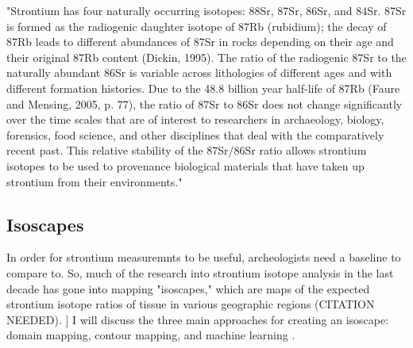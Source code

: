 \documentclass[a4paper, 12pt]{article}
\begin{document}
"Strontium has four naturally occurring isotopes: 88Sr, 87Sr, 86Sr, and 84Sr. 87Sr is formed as the radiogenic daughter isotope of 87Rb (rubidium); the decay of 87Rb leads to different abundances of 87Sr in rocks depending on their age and their original 87Rb content (Dickin, 1995). The ratio of the radiogenic 87Sr to the naturally abundant 86Sr is variable across lithologies of different ages and with different formation histories. Due to the 48.8 billion year half-life of 87Rb (Faure and Mensing, 2005, p. 77), the ratio of 87Sr to 86Sr does not change significantly over the time scales that are of interest to researchers in archaeology, biology, forensics, food science, and other disciplines that deal with the comparatively recent past. This relative stability of the 87Sr/86Sr ratio allows strontium isotopes to be used to provenance biological materials that have taken up strontium from their environments."


\subsection{Isoscapes}
In order for strontium measuremnts to be useful, archeologists need a baseline to compare to.
So, much of the research into strontium isotope analysis in the last decade has gone
into mapping "isoscapes," which are maps of the expected strontium isotope ratios of tissue in various geographic regions (CITATION NEEDED).
]
I will discuss the three main approaches for creating an isoscape: domain mapping,
contour mapping, and machine learning \citep{bataille2020}.
\end{document}
